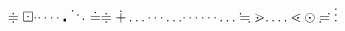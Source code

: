 $
      \Doteq
      \boxdot
      \cdot
      \cdotp
      \cdots
      \centerdot
      \ddots
      \doteq
      \doteqdot
      \dotplus
      \dots
      \dotsb
      \dotsc
      \dotsi
      \dotsm
      \dotso
      \fallingdotseq
      \gtrdot
      \ldotp
      \ldots
      \lessdot
      \odot
      \risingdotseq
      \vdots
$
